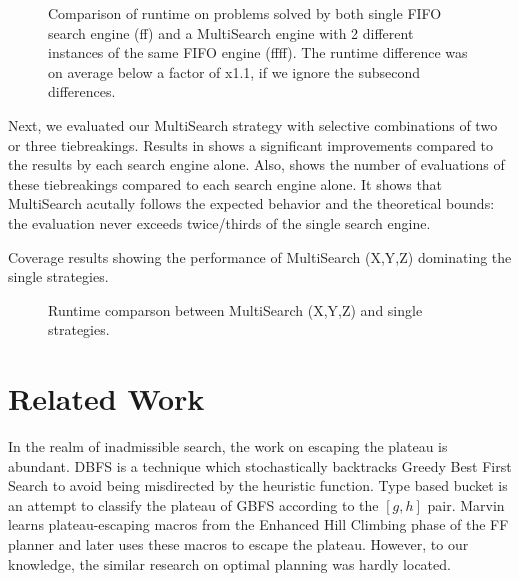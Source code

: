 \begin{figure}[htbp]
 \centering
 \caption{Comparison of runtime on problems solved by both single FIFO search engine (ff) and a MultiSearch engine with 2 different instances of the same FIFO engine (ffff). The runtime difference was on average below a factor of x1.1, if we ignore the subsecond differences.}
 \label{ffff}
\end{figure}

Next, we evaluated our MultiSearch
strategy with selective combinations of two or three tiebreakings.
Results in 
shows a significant improvements compared to the results by each search
engine alone.
% 
Also,  shows the number of evaluations of these
tiebreakings compared to each search engine alone.  It shows that
MultiSearch acutally follows the expected behavior and the theoretical
bounds: the evaluation never exceeds twice/thirds of the single
search engine.

\begin{table}[htbp]
 \centering
 \caption{Coverage results showing the performance of MultiSearch
 (X,Y,Z) dominating the single strategies.}
 \label{portfolio-coverage}
\end{table}

\begin{figure}[htbp]
 \centering
 \caption{Runtime comparson between MultiSearch (X,Y,Z) and single strategies.}
 \label{portfolio-runtime}
\end{figure}


\section{Related Work}
\label{sec-4}

In the realm of inadmissible search, the work on escaping the plateau is
abundant. DBFS \cite{imai2011novel} is a technique which stochastically
backtracks Greedy Best First Search to avoid being misdirected by the
heuristic function. Type based bucket \cite{xie14type} is an attempt to
classify the plateau of GBFS according to the $[g,h]$ pair.
Marvin \cite{Coles07} learns plateau-escaping macros from the Enhanced
Hill Climbing phase of the FF planner \cite{Hoffmann01} and later uses
these macros to escape the plateau.  However, to our knowledge, the
similar research on optimal planning was hardly located.

